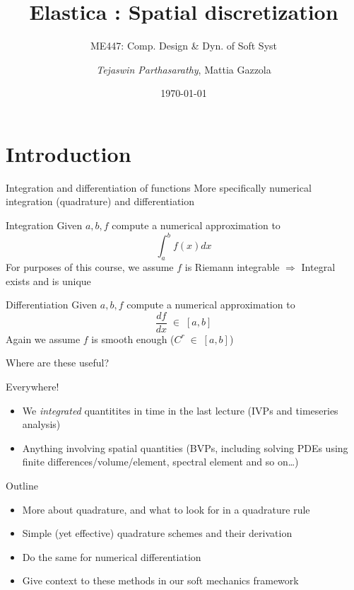\documentclass[presentation]{beamer}
\author{\emph{Tejaswin Parthasarathy}, Mattia Gazzola}
\date{\today}
\title{Elastica : Spatial discretization}
\subtitle{ME447: Comp. Design \& Dyn. of Soft Syst}
\begin{document}
\maketitle
\tikzset{>=latex}
\section{Introduction}
\label{sec:orge774469}
\begin{frame}[label={sec:org7f9ec4c}]{Integration and differentiation of functions}
More specifically numerical integration (\alert{quadrature}) and differentiation
\begin{block}{Integration}
Given \(a, b, f\) compute a numerical approximation to
\[ \int_{a}^{b} f(x) dx \]
For purposes of this course, we assume \(f\) is Riemann integrable
  \(\Rightarrow\) Integral exists and is unique
\end{block}
\begin{block}{Differentiation}
Given \(a, b, f\) compute a numerical approximation to
\[ \frac{df}{dx} \; \in \; [a,b]\]
Again we assume \(f\) is smooth enough (\(C^{r}\;\in\;[a,b]\))
\end{block}
\end{frame}
\begin{frame}[label={sec:orgf272416}]{Where are these useful?}
\begin{block}{Everywhere!}
\begin{itemize}
\item We \emph{integrated} quantitites in time in the last lecture (IVPs and
timeseries analysis)
\item Anything involving spatial quantities (BVPs, including solving PDEs using
finite differences/volume/element, spectral element and so on\ldots{})
\end{itemize}
\end{block}
\end{frame}
\begin{frame}[label={sec:org9e7d555}]{Outline}
\begin{itemize}
\item More about quadrature, and what to look for in a quadrature rule
\item Simple (yet effective) quadrature schemes and their derivation
\item Do the same for numerical differentiation
\item Give context to these methods in our soft mechanics framework
\end{itemize}
\end{frame}
\end{document}
